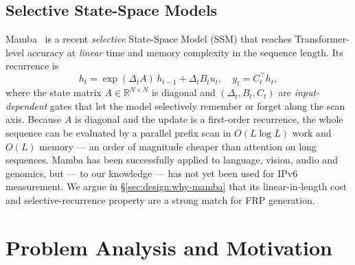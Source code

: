 \documentclass[conference]{IEEEtran}
\begin{document}
\subsection{Selective State-Space Models}
\label{sec:bg:mamba}
Mamba~\cite{gu2023mamba} is a recent \emph{selective} State-Space
Model (SSM) that reaches Transformer-level accuracy at
\emph{linear} time and memory complexity in the sequence length.
Its recurrence is
\begin{equation}
h_t = \exp(\Delta_t A)\,h_{t-1} + \Delta_t B_t u_t,
\quad y_t = C_t^{\top} h_t,
\label{eq:mamba-ssm}
\end{equation}
where the state matrix $A\!\in\!\mathbb{R}^{N\times N}$ is
diagonal and $(\Delta_t, B_t, C_t)$ are \emph{input-dependent}
gates that let the model selectively remember or forget along the
scan axis.  Because $A$ is diagonal and the update is a first-order
recurrence, the whole sequence can be evaluated by a parallel
prefix scan in $O(L\log L)$ work and $O(L)$ memory --- an order
of magnitude cheaper than attention on long sequences.
Mamba has been successfully applied to language, vision, audio and
genomics, but --- to our knowledge --- has not yet been used for
IPv6 measurement.  We argue in \S\ref{sec:design:why-mamba} that
its linear-in-length cost and selective-recurrence property are a
strong match for FRP generation.


\section{Problem Analysis and Motivation}\label{sec:motivation}
\end{document}
